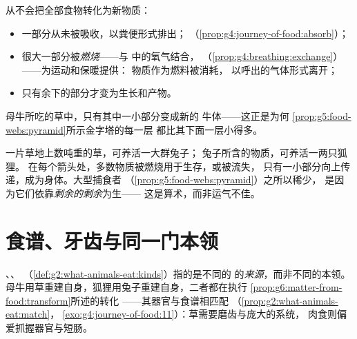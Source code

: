 \begin{proposition}[并非所有食物都变成身体]\label{prop:g6:matter-from-food:losses}
从不会把全部食物转化为新物质：
\begin{itemize}
  \item 一部分从未被吸收，以粪便形式排出；
        （\cref{prop:g4:journey-of-food:absorb}）；
  \item 很大一部分被\emph{燃烧}——与
        中的氧气结合，
        （\cref{prop:g4:breathing:exchange}）——为运动和保暖提供：
        物质作为燃料被消耗，
        以呼出的气体形式离开；
  \item 只有余下的部分才变为生长和产物。
\end{itemize}
母牛所吃的草中，只有其中一小部分变成新的
牛体——这正是为何
\cref{prop:g5:food-webs:pyramid}所示金字塔的每一层
都比其下面一层小得多。
\end{proposition}
\admitted

\begin{example}[金字塔终得解释]\label{ex:g6:matter-from-food:pyramid}
一片草地上数吨重的草，可养活一大群兔子；
兔子所含的物质，可养活一两只狐狸。
在每个箭头处，多数物质被燃烧用于生存，或被流失，
只有一小部分向上传递，成为身体。大型捕食者
（\cref{prop:g5:food-webs:pyramid}）之所以稀少，
是因为它们依靠\emph{剩余的剩余}为生——
这是算术，而非运气不佳。
\end{example}

\section{食谱、牙齿与同一门本领}

\begin{proposition}\label{prop:g6:matter-from-food:menus}
、、
（\cref{def:g2:what-animals-eat:kinds}）指的是不同的
的\emph{来源}，而非不同的本领。
母牛用草重建自身，狐狸用兔子重建自身，二者都在执行
\cref{prop:g6:matter-from-food:transform}所述的转化
——其器官与食谱相匹配
（\cref{prop:g2:what-animals-eat:match}，
\cref{exo:g4:journey-of-food:11}）：草需要磨齿与庞大的系统，
肉食则偏爱抓握器官与短肠。
\end{proposition}
\admitted

